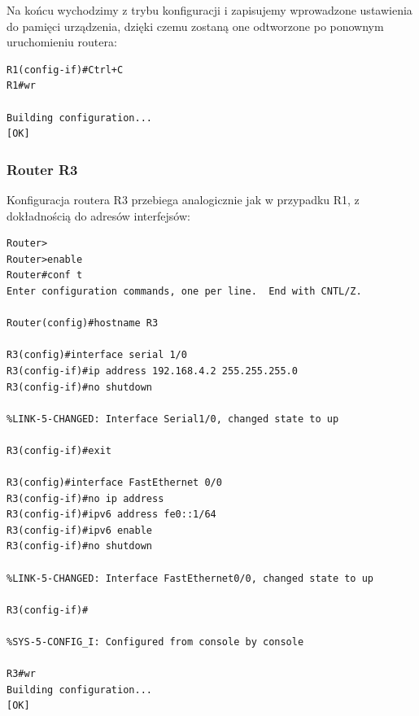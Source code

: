\documentclass[polish,11pt,a4paper,twoside]{article}
\begin{document}
Na końcu wychodzimy z trybu konfiguracji i zapisujemy wprowadzone ustawienia do pamięci urządzenia, dzięki czemu zostaną one odtworzone po ponownym uruchomieniu routera:
\begin{lstlisting}
R1(config-if)#Ctrl+C
R1#wr

Building configuration...
[OK]
\end{lstlisting}


\subsubsection{Router R3}
Konfiguracja routera R3 przebiega analogicznie jak w przypadku R1, z dokładnością do adresów interfejsów:
\begin{lstlisting}
Router>
Router>enable
Router#conf t
Enter configuration commands, one per line.  End with CNTL/Z.

Router(config)#hostname R3

R3(config)#interface serial 1/0
R3(config-if)#ip address 192.168.4.2 255.255.255.0
R3(config-if)#no shutdown 

%LINK-5-CHANGED: Interface Serial1/0, changed state to up

R3(config-if)#exit

R3(config)#interface FastEthernet 0/0
R3(config-if)#no ip address 
R3(config-if)#ipv6 address fe0::1/64
R3(config-if)#ipv6 enable
R3(config-if)#no shutdown 

%LINK-5-CHANGED: Interface FastEthernet0/0, changed state to up

R3(config-if)#

%SYS-5-CONFIG_I: Configured from console by console

R3#wr
Building configuration...
[OK]
\end{lstlisting}
\end{document}
